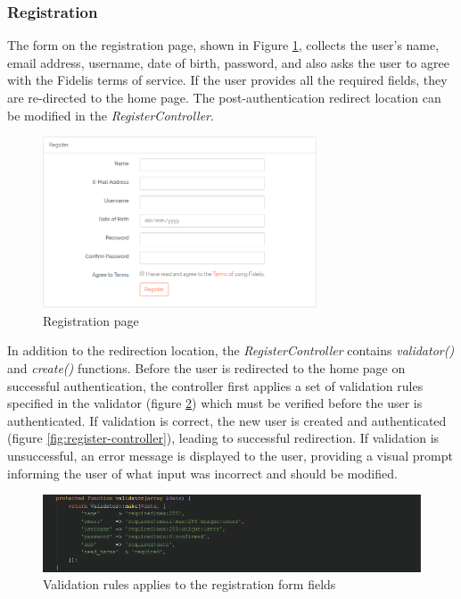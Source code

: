 \subsubsection{Registration}
The form on the registration page, shown in Figure \ref{fig:RegisterPage}, collects the user's name, email address, username, date of birth, password, and also asks the user to agree with the Fidelis terms of service. If the user provides all the required fields, they are re-directed to the home page. The post-authentication redirect location can be modified in the \textit{RegisterController}.

\begin{figure}[H]
\centering
\includegraphics[height=2in]{Images/Design/register-page}
\caption{Registration page}
\label{fig:RegisterPage}
\end{figure}

In addition to the redirection location, the \textit{RegisterController} contains \textit{validator()} and \textit{create()} functions. Before the user is redirected to the home page on successful authentication, the controller first applies a set of validation rules specified in the validator (figure \ref{fig:RegValidation}) which must be verified before the user is authenticated. If validation is correct, the new user is created and authenticated (figure \ref{fig:register-controller}), leading to successful redirection. If validation is unsuccessful, an error message is displayed to the user, providing a visual prompt informing the user of what input was incorrect and should be modified.

\begin{figure}[H]
\centering
\includegraphics[width=\textwidth]{Images/Implementation/RegisterValidation}
\caption{Validation rules applies to the registration form fields}
\label{fig:RegValidation}
\end{figure}

